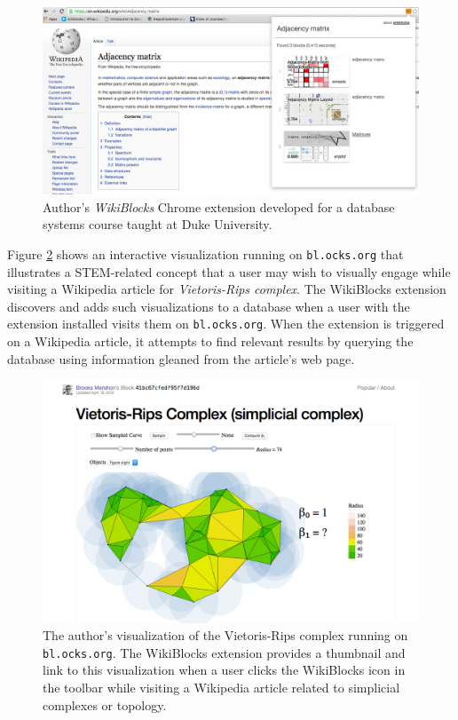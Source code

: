 \documentclass[a4paper, 11pt]{article} %
\begin{document}
\begin{figure}[h]
	\centering
	\includegraphics[width=\textwidth]{wikiblocks-adjacency}
	\caption{Author's \textit{WikiBlocks} Chrome extension developed for a database systems course taught at Duke University.}
	\label{fig:wikiblocks}
\end{figure}


\eject

Figure \ref{fig:rips-complex} shows an interactive visualization running on \texttt{bl.ocks.org} that illustrates a STEM-related concept that a user may wish to visually engage while visiting a Wikipedia article for \textit{Vietoris-Rips complex}. The WikiBlocks extension discovers and adds such visualizations to a database when a user with the extension installed visits them on \texttt{bl.ocks.org}. When the extension is triggered on a Wikipedia article, it attempts to find relevant results by querying the database using information gleaned from the article's web page.

\begin{figure}[h]
	\centering
	\includegraphics[width=\textwidth]{rips-complex}
	\caption{The author's visualization of the Vietoris-Rips complex running on \texttt{bl.ocks.org}. The WikiBlocks extension provides a thumbnail and link to this visualization when a user clicks the WikiBlocks icon in the toolbar while visiting a Wikipedia article related to simplicial complexes or topology.}
	\label{fig:rips-complex}
\end{figure}
\end{document}

